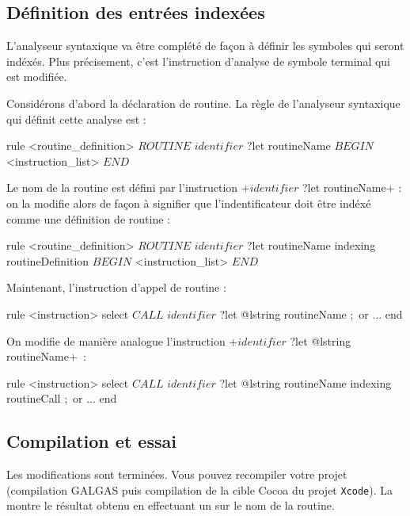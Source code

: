 \subsection{Définition des entrées indexées}

L'analyseur syntaxique va être complété de façon à définir les symboles qui seront indéxés. Plus précisement, c'est l'instruction d'analyse de symbole terminal qui est modifiée.

Considérons d'abord la déclaration de routine. La règle de l'analyseur syntaxique qui définit cette analyse est :

\begin{galgas4}
rule <routine_definition> {
  $ROUTINE$
  $identifier$ ?let routineName
  $BEGIN$
  <instruction_list>
  $END$
}
\end{galgas4}

Le nom de la routine est défini par l'instruction \ggsq+$identifier$ ?let routineName+ : on la modifie alors de façon à signifier que l'indentificateur doit être indéxé comme une définition de routine :

\begin{galgas4}
rule <routine_definition> {
  $ROUTINE$
  $identifier$ ?let routineName indexing routineDefinition
  $BEGIN$
  <instruction_list>
  $END$
}
\end{galgas4}

Maintenant, l'instruction d'appel de routine :

\begin{galgas4}
rule <instruction> {
  select
    $CALL$
    $identifier$ ?let @lstring routineName
    $;$
  or
    ...
  end
}
\end{galgas4}

On modifie de manière analogue l'instruction \ggsq+$identifier$ ?let @lstring routineName+~:

\begin{galgas4}
rule <instruction> {
  select
    $CALL$
    $identifier$ ?let @lstring routineName indexing routineCall
    $;$
  or
    ...
  end
}
\end{galgas4}



\subsection{Compilation et essai}

Les modifications sont terminées. Vous pouvez recompiler votre projet (compilation GALGAS puis compilation de la cible Cocoa du projet \texttt{Xcode}). La  montre le résultat obtenu en effectuant un  sur le nom de la routine.

